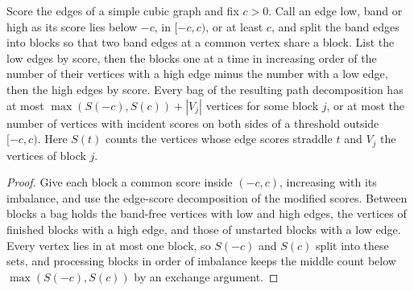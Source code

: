 \begin{lemma}
  \label{lem:lowerbounds-algebraic-gaussian-band-order}
  \leanok
  Score the edges of a simple cubic graph and fix $c>0$. Call an edge low, band or high
  as its score lies below $-c$, in $[-c,c)$, or at least $c$, and split the band edges into
  blocks so that two band edges at a common vertex share a block. List the low edges by
  score, then the blocks one at a time in increasing order of the number of their vertices
  with a high edge minus the number with a low edge, then the high edges by score. Every bag
  of the resulting path decomposition has at most
  $\max(S(-c),S(c))+|V_j|$ vertices for some block $j$, or at most the number of vertices
  with incident scores on both sides of a threshold outside $[-c,c)$. Here $S(t)$ counts
  the vertices whose edge scores straddle $t$ and $V_j$ the vertices of block $j$.
\end{lemma}
\begin{proof}
  \leanok
  Give each block a common score inside $(-c,c)$, increasing with its imbalance, and use the
  edge-score decomposition of the modified scores. Between blocks a bag holds the band-free
  vertices with low and high edges, the vertices of finished blocks with a high edge, and
  those of unstarted blocks with a low edge. Every vertex lies in at most one block, so
  $S(-c)$ and $S(c)$ split into these sets, and processing blocks in order of imbalance keeps
  the middle count below $\max(S(-c),S(c))$ by an exchange argument.
\end{proof}


